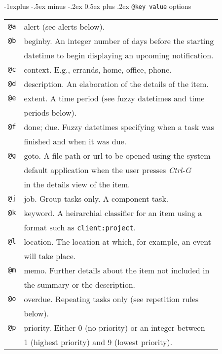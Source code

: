 \documentclass[10pt,landscape]{article}
\makeatletter
\renewcommand{\subsection}{\@startsection{subsection}{2}{0mm}%
                                {-1explus -.5ex minus -.2ex}%
                                {0.5ex plus .2ex}%
                                {\normalfont\normalsize\bfseries}}
\makeatother
\begin{document}
\begin{multicols}{3}
\subsection{\texttt{@key value} options}
\newlength{\MyLen}
\begin{tabular}{@{}ll@{}}
\texttt{@a} & alert (see alerts below). \\
\texttt{@b} & beginby. An integer number of days before the starting \\
            & datetime to begin displaying an upcoming notification. \\
\texttt{@c} & context. E.g., errands, home, office, phone. \\
\texttt{@d} & description. An elaboration of the details of the item. \\
\texttt{@e} & extent. A time period (see fuzzy datetimes and time \\
            & periods below).\\
\texttt{@f} & done; due. Fuzzy datetimes specifying when a task was \\
            & finished and when it was due. \\
\texttt{@g} & goto. A file path or url to be opened using the system \\
            & default application when the user presses \emph{Ctrl-G} \\
            & in the details view of the item. \\
\texttt{@j} & job. Group tasks only. A component task. \\
\texttt{@k} & keyword. A heirarchial classifier for an item using a \\
            & format such as \texttt{client:project}. \\
\texttt{@l} & location. The location at which, for example, an event \\
            & will take place. \\
\texttt{@m} & memo. Further details about the item not included in \\
            & the summary or the description. \\
\texttt{@o} & overdue. Repeating tasks only (see repetition rules \\
            & below). \\
\texttt{@p} & priority. Either 0 (no priority) or an integer between \\
            & 1 (highest priority) and 9 (lowest priority). \\
\end{tabular}


\end{multicols}
\end{document}
